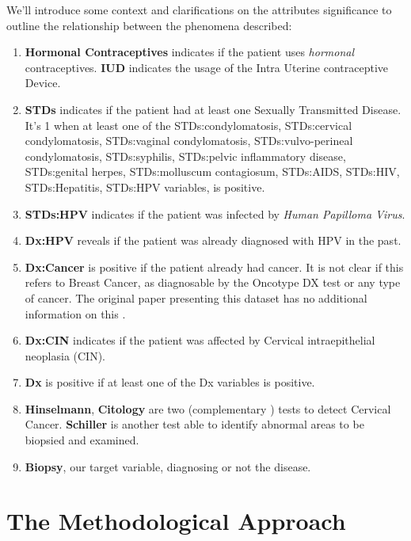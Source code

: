 We'll introduce some context and clarifications on the attributes significance to outline the relationship between the phenomena described:
\begin{enumerate}
    \item \textbf{Hormonal Contraceptives} indicates if the patient uses \textit{hormonal} contraceptives. \textbf{IUD} indicates the usage of the Intra Uterine contraceptive Device.
    \item \textbf{STDs} indicates if the patient had at least one Sexually Transmitted Disease. It's 1 when at least one of the STDs:condylomatosis, STDs:cervical condylomatosis, STDs:vaginal condylomatosis, STDs:vulvo-perineal condylomatosis, STDs:syphilis, STDs:pelvic inflammatory disease, STDs:genital herpes, STDs:molluscum contagiosum, STDs:AIDS, STDs:HIV, STDs:Hepatitis, STDs:HPV variables, is positive.
    \item \textbf{STDs:HPV} indicates if the patient was infected by \textit{Human Papilloma Virus}.
    \item \textbf{Dx:HPV} reveals if the patient was already diagnosed with HPV in the past.
    \item \textbf{Dx:Cancer} is positive if the patient already had cancer. It is not clear if this refers to Breast Cancer, as diagnosable by the Oncotype DX test or any type of cancer. The original paper presenting this dataset has no additional information on this \cite{articleUCI}.
    \item \textbf{Dx:CIN} indicates if the patient was affected by Cervical intraepithelial neoplasia (CIN).
    \item \textbf{Dx} is positive if at least one of the Dx variables is positive.
    \item \textbf{Hinselmann}, \textbf{Citology} are two (complementary \cite{Duncan2004}) tests to detect Cervical Cancer. \textbf{Schiller} is another test able to identify abnormal areas to be biopsied and examined.
    \item \textbf{Biopsy}, our target variable, diagnosing or not the disease.
\end{enumerate}

\section{The Methodological Approach}


